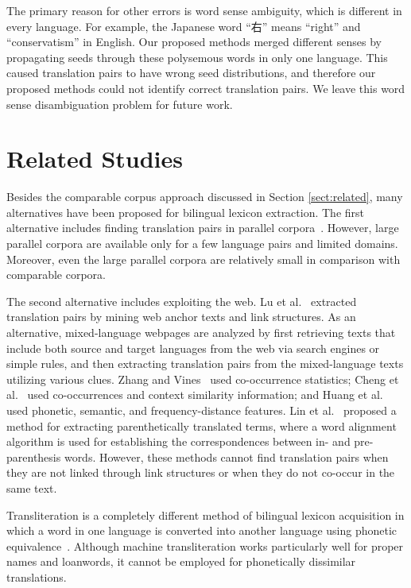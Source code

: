 \documentclass[english]{jnlp_1.4}
\begin{document}
The primary reason for other errors is word sense ambiguity, which is different in every language. 
For example, the Japanese word ``右'' means ``right'' and ``conservatism'' in English. 
Our proposed methods merged different senses by propagating seeds through these polysemous words in only one language. 
This caused translation pairs to have wrong seed distributions, and therefore our proposed methods could not identify correct translation pairs. 
We leave this word sense disambiguation problem for future work. 


\section{Related Studies}

Besides the comparable corpus approach discussed in Section \ref{sect:related}, many alternatives have been proposed for bilingual lexicon extraction. 
The first alternative includes finding translation pairs in parallel corpora~\cite{wu94,fung94,och03}. 
However, large parallel corpora are available only for a few language pairs and limited domains. 
Moreover, even the large parallel corpora are relatively small in comparison with comparable corpora. 

The second alternative includes exploiting the web. 
Lu et al.~\citeyear{lu04} extracted translation pairs by mining web anchor texts and link structures. 
As an alternative, mixed-language webpages are analyzed by first retrieving texts that include both source and target languages from the web via search engines or simple rules, and then extracting translation pairs from the mixed-language texts utilizing various clues. 
Zhang and Vines~\citeyear{zhang04} used co-occurrence statistics; Cheng et al.~\citeyear{cheng04} used co-occurrences and context similarity information; and Huang et al.~\citeyear{fei05} used phonetic, semantic, and frequency-distance features. 
Lin et al.~\citeyear{lin08} proposed a method for extracting parenthetically translated terms, where a word alignment algorithm is used for establishing the correspondences between in- and pre-parenthesis words. 
However, these methods cannot find translation pairs when they are not linked through link structures or when they do not co-occur in the same text. 

Transliteration is a completely different method of bilingual lexicon acquisition in which a word in one language is converted into another language using phonetic equivalence~\cite{knight98,karimi11}. 
Although machine transliteration works particularly well for proper names and loanwords, it cannot be employed for phonetically dissimilar translations. 
\end{document}
